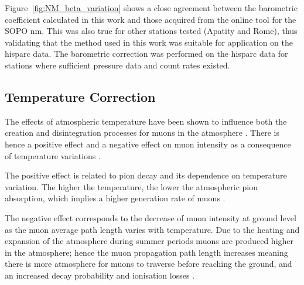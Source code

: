 Figure~\ref{fig:NM_beta_variation} shows a close agreement between the barometric coefficient calculated in this work and those acquired from the online tool for the SOPO \gls{nm}. This was also true for other stations tested (Apatity and Rome), thus validating that the method used in this work was suitable for application on the \gls{hisparc} data. The barometric correction was performed on the \gls{hisparc} data for stations where sufficient pressure data and count rates existed.





\subsection{Temperature Correction}\label{sec:HS_T_corr}

The effects of atmospheric temperature have been shown to influence both the creation and disintegration processes for muons in the atmosphere \citep{berkova_temperature_2011}. There is hence a positive effect and a negative effect on muon intensity as a consequence of temperature variations \citep{mendoncca_temperature_2016}. 

The positive effect is related to pion decay and its dependence on temperature variation. The higher the temperature, the lower the atmospheric pion absorption, which implies a higher generation rate of muons \citep{mendoncca_temperature_2016}.

The negative effect corresponds to the decrease of muon intensity at ground level as the muon average path length varies with temperature. Due to the heating and expansion of the atmosphere during summer periods muons are produced higher in the atmosphere; hence the muon propagation path length increases meaning there is more atmosphere for muons to traverse before reaching the ground, and an increased decay probability and ionisation losses \citep{savic_pressure_2015, mendoncca_temperature_2016}.

